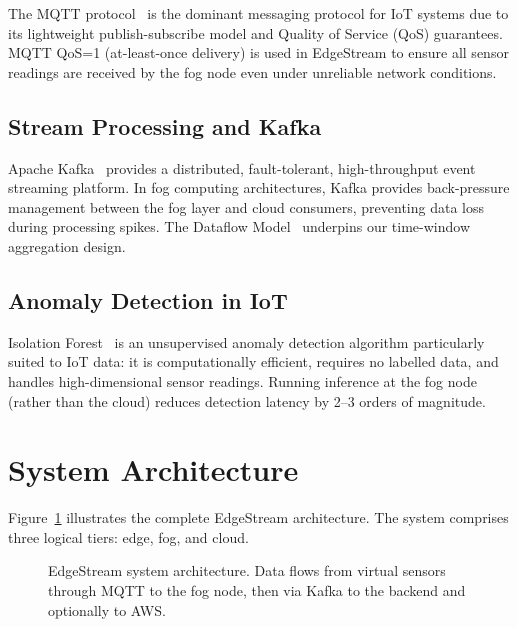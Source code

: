 \documentclass[conference]{IEEEtran}
\begin{document}
The MQTT protocol~\cite{oasis2019mqtt} is the dominant messaging protocol for IoT systems due to its lightweight publish-subscribe model and Quality of Service (QoS) guarantees. MQTT QoS=1 (at-least-once delivery) is used in EdgeStream to ensure all sensor readings are received by the fog node even under unreliable network conditions.

\subsection{Stream Processing and Kafka}

Apache Kafka~\cite{kreps2011kafka} provides a distributed, fault-tolerant, high-throughput event streaming platform. In fog computing architectures, Kafka provides back-pressure management between the fog layer and cloud consumers, preventing data loss during processing spikes. The Dataflow Model~\cite{akidau2015dataflow} underpins our time-window aggregation design.

\subsection{Anomaly Detection in IoT}

Isolation Forest~\cite{liu2008isolation} is an unsupervised anomaly detection algorithm particularly suited to IoT data: it is computationally efficient, requires no labelled data, and handles high-dimensional sensor readings. Running inference at the fog node (rather than the cloud) reduces detection latency by 2--3 orders of magnitude.

\section{System Architecture}
\label{sec:architecture}

Figure~\ref{fig:architecture} illustrates the complete EdgeStream architecture. The system comprises three logical tiers: edge, fog, and cloud.

\begin{figure}[H]
    \centering
    \caption{EdgeStream system architecture. Data flows from virtual sensors through MQTT to the fog node, then via Kafka to the backend and optionally to AWS.}
    \label{fig:architecture}
\end{figure}
\end{document}
